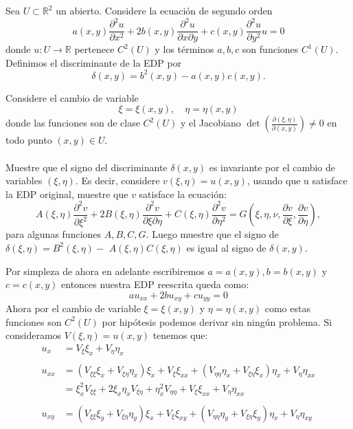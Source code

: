 \begin{homeworkProblem}
Sea $U \subset \mathbb{R}^2$ un abierto. Considere la ecuación de segundo orden
$$
a(x, y) \frac{\partial^2 u}{\partial x^2}+2 b(x, y) \frac{\partial^2 u}{\partial x \partial y}+c(x, y) \frac{\partial^2 u}{\partial y^2} u=0
$$
donde $u: U \rightarrow \mathbb{R}$ pertenece $C^2(U)$ y los términos $a, b, c$ son funciones $C^1(U)$. Definimos el discriminante de la EDP por
$$
\delta(x, y)=b^2(x, y)-a(x, y) c(x, y) .
$$

Considere el cambio de variable
$$
\xi=\xi(x, y), \quad \eta=\eta(x, y)
$$
donde las funciones son de clase $C^2(U)$ y el Jacobiano $\operatorname{det}\left(\frac{\partial(\xi, \eta)}{\partial(x, y)}\right) \neq 0$ en todo punto $(x, y) \in U$.\\
\\
    Muestre que el signo del discriminante $\delta(x, y)$ es invariante por el cambio de variables $(\xi, \eta)$. Es decir, considere $v(\xi, \eta)=u(x, y)$, usando que u satisface la EDP original, muestre que $v$ satisface la ecuación:
$$
A(\xi, \eta) \frac{\partial^2 v}{\partial \xi^2}+2 B(\xi, \eta) \frac{\partial^2 v}{\partial \xi \partial \eta}+C(\xi, \eta) \frac{\partial^2 v}{\partial \eta^2}=G\left(\xi, \eta, \nu, \frac{\partial v}{\partial \xi}, \frac{\partial v}{\partial \eta}\right),
$$
para algunas funciones $A, B, C, G$. Luego muestre que el signo de $\delta(\xi, \eta)=B^2(\xi, \eta)-$ $A(\xi, \eta) C(\xi, \eta)$ es igual al signo de $\delta(x, y)$.
    \begin{solucion}
        Por simpleza de ahora en adelante escribiremos $a=a(x,y),b=b(x,y)$ y $c=c(x,y)$ entonces nuestra EDP reescrita queda como:
        $$au_{xx}+2bu_{xy}+cu_{yy}=0$$
        Ahora por el cambio de variable $\xi=\xi(x,y)$ y $\eta=\eta(x,y)$ como estas funciones son $C^2(U)$ por hipótesis podemos derivar sin ningún problema. Si consideramos $V(\xi,\eta)=u(x,y)$ tenemos que:
        \begin{align*}
            u_x&=V_\xi\xi_x+V_\eta\eta_x\\
            \\
            u_{xx}&=(V_{\xi\xi}\xi_x+V_{\xi\eta}\eta_x)\xi_x+V_\xi\xi_{xx}+(V_{\eta\eta}\eta_x+V_{\xi\eta}\xi_x)\eta_x+V_\eta\eta_{xx}\\
            &=\xi^2_xV_{\xi\xi}+2\xi_x\eta_xV_{\xi\eta}+\eta^2_xV_{\eta\eta}+V_\xi\xi_{xx}+V_\eta\eta_{xx}\\
            \\
            u_{xy}&=(V_{\xi\xi}\xi_y+V_{\xi\eta}\eta_y)\xi_x+V_\xi\xi_{xy}+(V_{\eta\eta}\eta_y+V_{\xi\eta}\xi_y)\eta_x+V_\eta\eta_{xy}\\

\end{align*}
\end{solucion}
\end{homeworkProblem}
